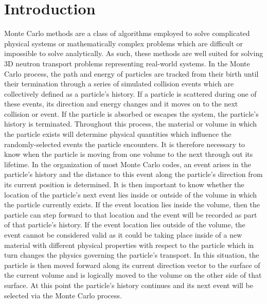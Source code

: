 \documentclass[12pt, a4paper]{article}
\begin{document}
\section{Introduction}%


Monte Carlo methods are a class of algorithms employed to solve complicated physical systems or mathematically complex problems which are difficult or impossible to solve analytically. As such, these methods are well suited for solving 3D neutron transport problems representing real-world systems. In the Monte Carlo process, the path and energy of particles are tracked from their birth until their termination through a series of simulated collision events which are collectively defined as a particle's history. If a particle is scattered during one of these events, its direction and energy changes and it moves on to the next collision or event. If the particle is absorbed or escapes the system, the particle's history is terminated. Throughout this process, the material or volume in which the particle exists will determine physical quantities which influence the randomly-selected events the particle encounters. It is therefore necessary to know when the particle is moving from one volume to the next through out its lifetime. In the organization of most Monte Carlo codes, an event arises in the particle's history and the distance to this event along the particle's direction from its current position is determined. It is then important to know whether the location of the particle's next event lies inside or outside of the volume in which the particle currently exists. If the event location lies inside the volume, then the particle can step forward to that location and the event will be recorded as part of that particle's history. If the event location lies outside of the volume, the event cannot be considered valid as it could be taking place inside of a new material with different physical properties with respect to the particle which in turn changes the physics governing the particle's transport. In this situation, the particle is then moved forward along its current direction vector to the surface of the current volume and is logically moved to the volume on the other side of that surface. At this point the particle's history continues and its next event will be selected via the Monte Carlo process.
\end{document}
